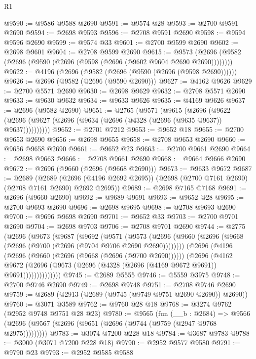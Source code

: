 \begin{lexlean}{R1}
\begin{coremodule}
@9590 := @9586 @9588 @2690
@9591 := @9574 @28
@9593 := @2700 @9591 @2690
@9594 := @2698 @9593
@9596 := @2708 @9591 @2690
@9598 := @9594 @9596 @2690
@9599 := @9574 @33
@9601 := @2700 @9599 @2690
@9602 := @2698 @9601
@9604 := @2708 @9599 @2690
@9615 := @9573 (@2696 (@9582 (@2696 (@9590 (@2696 (@9598 (@2696 (@9602 @9604 @2690 @2690))))))))
@9622 := @4196 (@2696 (@9582 (@2696 (@9590 (@2696 (@9598 @2690))))))
@9626 := @2696 (@9582 (@2696 (@9590 @2690)))
@9627 := @4162 @9626
@9629 := @2700 @5571 @2690
@9630 := @2698 @9629
@9632 := @2708 @5571 @2690
@9633 := @9630 @9632
@9634 := @9633 @9626
@9635 := @4169 @9626
@9637 := @2696 (@9582 @2690)
@9651 := @2765
    (@9571
      (@9615
        (@2696
          (@9622 (@2696 (@9627 (@2696 (@9634 (@2696 (@4328 (@2696 (@9635 @9637)) @9637))))))))))
@9652 := @2701 @7212
@9653 := @9652 @18
@9655 := @2700 @9653 @2690
@9656 := @2698 @9655
@9658 := @2708 @9653 @2690
@9660 := @9656 @9658 @2690
@9661 := @9652 @23
@9663 := @2700 @9661 @2690
@9664 := @2698 @9663
@9666 := @2708 @9661 @2690
@9668 := @9664 @9666 @2690
@9672 := @2696 (@9660 (@2696 (@9668 @2690)))
@9673 := @9633 @9672
@9687 := @2689
    (@2689 (@2696 (@4196 @2692 @2695)) (@2698 (@2700 @7161 @2690) (@2708 @7161 @2690) @2692 @2695))
@9689 := @2698 @7165 @7168
@9691 := @2696 (@9660 @2690)
@9692 := @9689 @9691
@9693 := @9652 @28
@9695 := @2700 @9693 @2690
@9696 := @2698 @9695
@9698 := @2708 @9693 @2690
@9700 := @9696 @9698 @2690
@9701 := @9652 @33
@9703 := @2700 @9701 @2690
@9704 := @2698 @9703
@9706 := @2708 @9701 @2690
@9744 := @2775
    (@2696
      (@9673
        (@9687
          (@9692
            (@9571
              (@9573
                (@2696 (@9660 (@2696 (@9668 (@2696 (@9700 (@2696 (@9704 @9706 @2690 @2690))))))))
                (@2696
                  (@4196
                    (@2696 (@9660 (@2696 (@9668 (@2696 (@9700 @2690))))))
                    (@2696
                      (@4162
                        @9672
                        (@2696 (@9673 (@2696 (@4328 (@2696 (@4169 @9672 @9691)) @9691))))))))))))))
@9745 := @2689 @5555
@9746 := @5559 @3975
@9748 := @2700 @9746 @2690
@9749 := @2698 @9748
@9751 := @2708 @9746 @2690
@9759 := @2689 (@2913 (@2689 (@9745 (@9749 @9751 @2690 @2690)) @2690))
@9760 := @3071 @3589
@9762 := @9760 @28 @18
@9768 := @3274 @9762 (@2952 @9748 @9751 @28 @23)
@9780 := @9565
    (fun (__b : @2684) =>
    @9566 (@2696 (@9567 (@2696 (@9651 (@2696 (@9744 (@9759 (@2947 @9768 @2975)))))))))
@9783 := @3074 @7200 @228 @18
@9784 := @3687 @9783
@9788 := @3000 (@3071 @7200 @228 @18)
@9790 := @2952 @9577 @9580
@9791 := @9790 @23
@9793 := @2952 @9585 @9588

\end{coremodule}
\end{lexlean}
